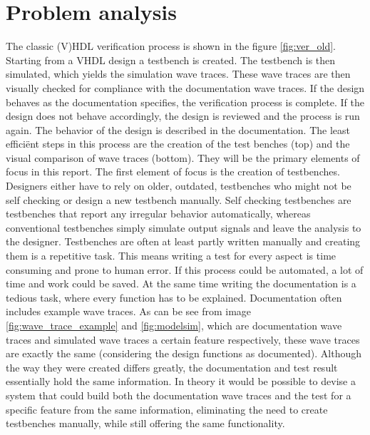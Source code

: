 
\chapter{Problem analysis}%
The classic (V)HDL verification process is shown in the figure \ref{fig:ver_old}. Starting from a VHDL design a testbench is created. The testbench is then simulated, which yields the simulation wave traces. These wave traces are then visually checked for compliance with the documentation wave traces. If the design behaves as the documentation specifies, the verification process is complete. If the design does not behave accordingly, the design is reviewed and the process is run again. The behavior of the design is described in the documentation.
\npar
The least efficiënt steps in this process are the creation of the test benches (top) and the visual comparison of wave traces (bottom). They will be the primary elements of focus in this report.
\npar
The first element of focus is the creation of testbenches. Designers either have to rely on older, outdated, testbenches who might not be self checking or design a new testbench manually. Self checking testbenches are testbenches that report any irregular behavior automatically, whereas conventional testbenches simply simulate output signals and leave the analysis to the designer. Testbenches are often at least partly written manually and creating them is a repetitive task. This means writing a test for every aspect is time consuming and prone to human error. If this process could be automated, a lot of time and work could be saved. At the same time writing the documentation is a tedious task, where every function has to be explained. Documentation often includes example wave traces. As can be see from image \ref{fig:wave_trace_example} and \ref{fig:modelsim}, which are documentation wave traces and simulated wave traces a certain feature respectively, these wave traces are exactly the same (considering the design functions as documented). Although the way they were created differs greatly, the documentation and test result essentially hold the same information. In theory it would be possible to devise a system that could build both the documentation wave traces and the test for a specific feature from the same information, eliminating the need to create testbenches manually, while still offering the same functionality.
